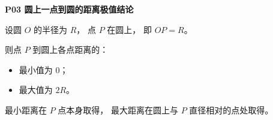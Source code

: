 \begin{statementbox}
\textbf{P03 圆上一点到圆的距离极值结论}

设圆 $O$ 的半径为 $R$，
点 $P$ 在圆上，
即 $OP=R$。

则点 $P$ 到圆上各点距离的：

\begin{itemize}
  \item 最小值为 $0$；
  \item 最大值为 $2R$。
\end{itemize}

最小距离在 $P$ 点本身取得，
最大距离在圆上与 $P$ 直径相对的点处取得。
\end{statementbox}
